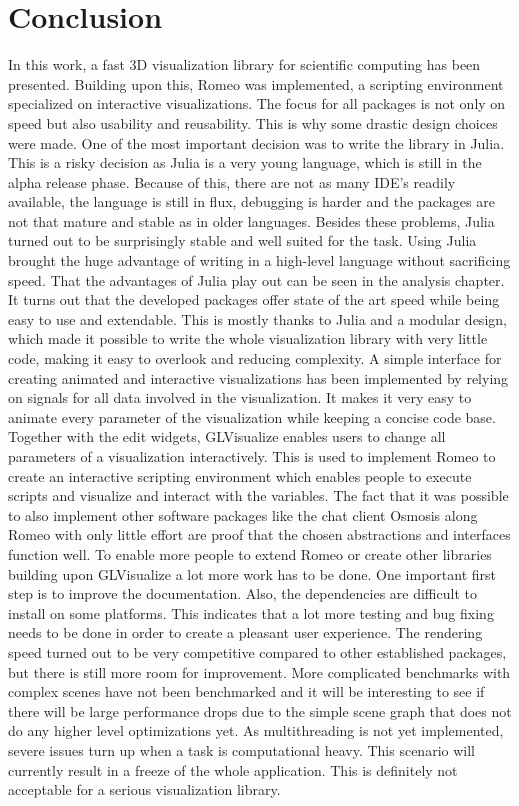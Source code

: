 \section{Conclusion}

In this work, a fast 3D visualization library for scientific computing has been presented.
Building upon this, Romeo was implemented, a scripting environment specialized on interactive visualizations. 
The focus for all packages is not only on speed but also usability and reusability. 
This is why some drastic design choices were made.
One of the most important decision was to write the library in Julia. 
This is a risky decision as Julia is a very young language, which is still in the alpha release phase. 
Because of this, there are not as many IDE's readily available, the language is still in flux, debugging is harder and the packages are not that mature and stable as in older languages.
Besides these problems, Julia turned out to be surprisingly stable and well suited for the task.
Using Julia brought the huge advantage of writing in a high-level language without sacrificing speed. 
That the advantages of Julia play out can be seen in the analysis chapter. It turns out that the developed packages offer state of the art speed while being easy to use and extendable. 
This is mostly thanks to Julia and a modular design, which made it possible to write the whole visualization library with very little code, making it easy to overlook and reducing complexity. 
A simple interface for creating animated and interactive visualizations has been implemented by relying on signals for all data involved in the visualization.
It makes it very easy to animate every parameter of the visualization while keeping a concise code base.
Together with the edit widgets, GLVisualize enables users to change all parameters of a visualization interactively. 
This is used to implement Romeo to create an interactive scripting environment which enables people to execute scripts and visualize and interact with the variables.
The fact that it was possible to also implement other software packages like the chat client Osmosis along Romeo with only little effort are proof that the chosen abstractions and interfaces function well.
To enable more people to extend Romeo or create other libraries building upon GLVisualize a lot more work has to be done. 
One important first step is to improve the documentation. 
Also, the dependencies are difficult to install on some platforms. This indicates that a lot more testing and bug fixing needs to be done in order to create a pleasant user experience.
The rendering speed turned out to be very competitive compared to other established packages, but there is still more room for improvement.
More complicated benchmarks with complex scenes have not been benchmarked and it will be interesting to see if there will be large performance drops due to the simple scene graph that does not do any higher level optimizations yet.
As multithreading is not yet implemented, severe issues turn up when a task is computational heavy. This scenario will currently result in a freeze of the whole application. This is definitely not acceptable for a serious visualization library.
 
